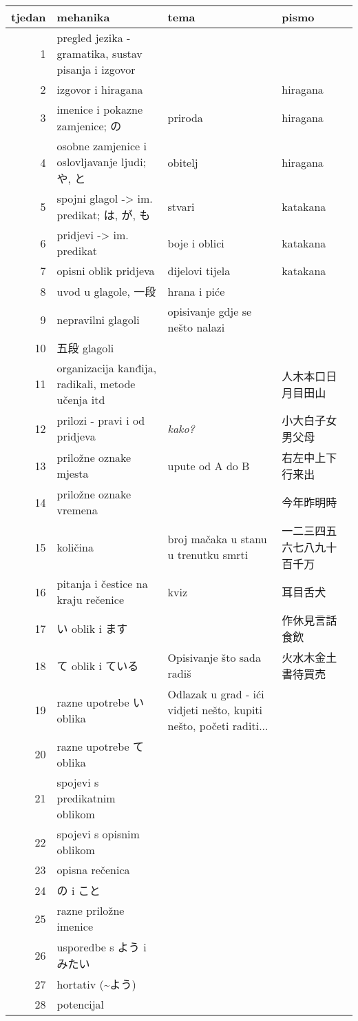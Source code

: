 

\author{Tomislav Mamić}


	
	\noindent
	\begin{tabular}{|r|p{150pt}|p{150pt}|p{120pt}|}
		\hline
		\textbf{tjedan}&\textbf{mehanika}&\textbf{tema}&\textbf{pismo}\\
		\hline
		1&pregled jezika - gramatika, sustav pisanja i izgovor&&\\
		\hline
		2&izgovor i hiragana&&hiragana\\
		\hline
		3&imenice i pokazne zamjenice; の&priroda&hiragana\\
		\hline
		4&osobne zamjenice i oslovljavanje ljudi; や, と&obitelj&hiragana\\
		\hline
		5&spojni glagol -> im. predikat; は, が, も&stvari&katakana\\
		\hline
		6&pridjevi -> im. predikat&boje i oblici&katakana\\
		\hline
		7&opisni oblik pridjeva&dijelovi tijela&katakana\\
		\hline
		8&uvod u glagole, 一段&hrana i piće&\\
		\hline
		9&nepravilni glagoli&opisivanje gdje se nešto nalazi&\\
		\hline
		10&五段 glagoli&&\\
		\hline
		11&organizacija kanđija, radikali, metode učenja itd&&人木本口日月目田山\\
		\hline
		12&prilozi - pravi i od pridjeva&\textit{kako?}&小大白子女男父母\\
		\hline
		13&priložne oznake mjesta&upute od A do B&右左中上下行来出\\
		\hline
		14&priložne oznake vremena&&今年昨明時\\
		\hline
		15&količina&broj mačaka u stanu u trenutku smrti&一二三四五六七八九十百千万\\
		\hline
		16&pitanja i čestice na kraju rečenice&kviz&耳目舌犬\\
		\hline
		17&い oblik i ます&&作休見言話食飲\\
		\hline
		18&て oblik i ている&Opisivanje što sada radiš&火水木金土書待買売\\
		\hline
		19&razne upotrebe い oblika&Odlazak u grad - ići vidjeti nešto, kupiti nešto, početi raditi...&\\
		\hline
		20&razne upotrebe て oblika&&\\
		\hline
		21&spojevi s predikatnim oblikom&&\\
		\hline
		22&spojevi s opisnim oblikom&&\\
		\hline
		23&opisna rečenica&&\\
		\hline
		24&の i こと&&\\
		\hline
		25&razne priložne imenice&&\\
		\hline
		26&usporedbe s よう i みたい&&\\
		\hline
		27&hortativ (\textasciitilde よう)&&\\
		\hline
		28&potencijal&&\\
		\hline
	\end{tabular}
	\noindent
	
